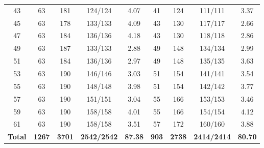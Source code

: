 \begin{table}[t]
\begin{tabular}{c|cccc|cccc}
43 & 63 & 181 & 124/124 & 4.07 & 41 & 124 & 111/111 & 3.37 \\
45 & 63 & 178 & 133/133 & 4.09 & 43 & 130 & 117/117 & 2.66 \\
47 & 63 & 184 & 136/136 & 4.18 & 43 & 130 & 118/118 & 2.86 \\
49 & 63 & 187 & 133/133 & 2.88 & 49 & 148 & 134/134 & 2.99 \\
51 & 63 & 184 & 136/136 & 2.97 & 49 & 148 & 135/135 & 3.63 \\
53 & 63 & 190 & 146/146 & 3.03 & 51 & 154 & 141/141 & 3.54 \\
55 & 63 & 190 & 148/148 & 3.98 & 51 & 154 & 142/142 & 3.77 \\
57 & 63 & 190 & 151/151 & 3.04 & 55 & 166 & 153/153 & 3.46 \\
59 & 63 & 190 & 158/158 & 4.01 & 55 & 166 & 154/154 & 4.12 \\
61 & 63 & 190 & 158/158 & 3.51 & 57 & 172 & 160/160 & 3.88 \\
\hline
\textbf{Total} & \textbf{1267} & \textbf{3701} & \textbf{2542/2542} & \textbf{87.38} &
\textbf{903} & \textbf{2738} & \textbf{2414/2414} & \textbf{80.70} \\
\hline
\end{tabular}
\end{table}
